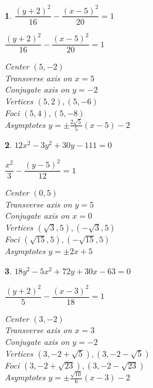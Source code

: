 \documentclass{amsbook}
\newtheorem{exc}{}
\newenvironment{ex}{\begin{exc}\normalfont}{\end{exc}}
\numberwithin{section}{chapter}
\numberwithin{equation}{chapter}
\begin{document}
\begin{multicols}{2}
	\begin{ex}
		$\dfrac{(y+2)^2}{16} - \dfrac{(x-5)^2}{20} = 1$
		\begin{sol}
			$\dfrac{(y+2)^2}{16} - \dfrac{(x-5)^2}{20} = 1$
			
			Center $(5, -2)$\\
			Transverse axis on $x=5$\\
			Conjugate axis on $y=-2$\\
			Vertices $(5,2), (5,-6)$\\
			Foci $\left(5,4 \right), \left(5,-8\right)$\\
			Asymptotes $y = \pm \frac{2\sqrt{5}}{5} (x-5)-2$\\
			
		\end{sol}
	\end{ex}
	
	\begin{ex}
		$12x^{2} - 3y^{2} + 30y - 111 = 0$
		\begin{sol}
		$\dfrac{x^{2}}{3} - \dfrac{(y - 5)^{2}}{12} = 1$
		
		Center $(0, 5)$\\
		Transverse axis on $y = 5$\\
		Conjugate axis on $x = 0$\\
		Vertices $(\sqrt{3}, 5), (-\sqrt{3}, 5)$\\
		Foci $(\sqrt{15}, 5), (-\sqrt{15}, 5)$\\
		Asymptotes $y = \pm 2x + 5$
		\end{sol}
	\end{ex}
	
	\begin{ex}
		$18y^{2} - 5x^{2} +  72y + 30x - 63= 0$
		\begin{sol}
		$\dfrac{(y + 2)^{2}}{5} - \dfrac{(x - 3)^{2}}{18} = 1$
		
		Center $(3, -2)$\\
		Transverse axis on $x = 3$\\
		Conjugate axis on $y = -2$\\
		Vertices $(3, -2 + \sqrt{5}), (3, -2 - \sqrt{5})$\\
		Foci $(3, -2 + \sqrt{23}), (3, -2 - \sqrt{23})$\\
		Asymptotes $y = \pm \frac{\sqrt{10}}{6}(x - 3) - 2$	
		\end{sol}
	\end{ex}
	
\end{multicols}
\end{document}
